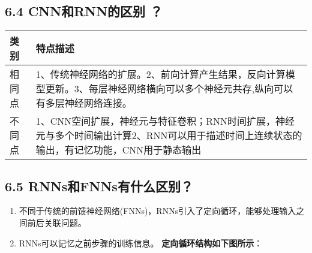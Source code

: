 \subsection{6.4 CNN和RNN的区别 ？}\label{cnnux548crnnux7684ux533aux522b}

\begin{longtable}[]{@{}ll@{}}
\toprule
\begin{minipage}[b]{0.09\columnwidth}\raggedright\strut
类别\strut
\end{minipage} & \begin{minipage}[b]{0.80\columnwidth}\raggedright\strut
特点描述\strut
\end{minipage}\tabularnewline
\midrule
\endhead
\begin{minipage}[t]{0.09\columnwidth}\raggedright\strut
相同点\strut
\end{minipage} & \begin{minipage}[t]{0.80\columnwidth}\raggedright\strut
1、传统神经网络的扩展。2、前向计算产生结果，反向计算模型更新。3、每层神经网络横向可以多个神经元共存,纵向可以有多层神经网络连接。\strut
\end{minipage}\tabularnewline
\begin{minipage}[t]{0.09\columnwidth}\raggedright\strut
不同点\strut
\end{minipage} & \begin{minipage}[t]{0.80\columnwidth}\raggedright\strut
1、CNN空间扩展，神经元与特征卷积；RNN时间扩展，神经元与多个时间输出计算2、RNN可以用于描述时间上连续状态的输出，有记忆功能，CNN用于静态输出\strut
\end{minipage}\tabularnewline
\bottomrule
\end{longtable}

\subsection{6.5
RNNs和FNNs有什么区别？}\label{rnnsux548cfnnsux6709ux4ec0ux4e48ux533aux522b}

\begin{enumerate}
\def\labelenumi{\arabic{enumi}.}
\item
  不同于传统的前馈神经网络(FNNs)，RNNs引入了定向循环，能够处理输入之间前后关联问题。
\item
  RNNs可以记忆之前步骤的训练信息。 \textbf{定向循环结构如下图所示}：
\end{enumerate}


